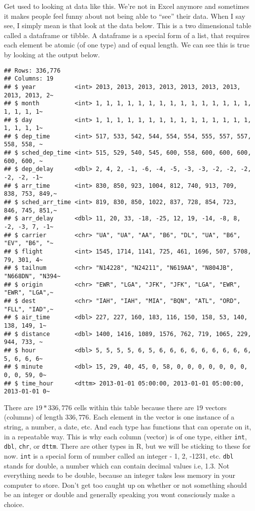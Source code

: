 \documentclass[
]{book}
\begin{document}
Get used to looking at data like this. We're not in Excel anymore and sometimes it makes people feel funny about not being able to ``see'' their data. When I say see, I simply mean is that look at the data below. This is a two dimensional table called a dataframe or tibble. A dataframe is a special form of a list, that requires each element be atomic (of one type) and of equal length. We can see this is true by looking at the output below.

\begin{verbatim}
## Rows: 336,776
## Columns: 19
## $ year           <int> 2013, 2013, 2013, 2013, 2013, 2013, 2013, 2013, 2013, 2~
## $ month          <int> 1, 1, 1, 1, 1, 1, 1, 1, 1, 1, 1, 1, 1, 1, 1, 1, 1, 1, 1~
## $ day            <int> 1, 1, 1, 1, 1, 1, 1, 1, 1, 1, 1, 1, 1, 1, 1, 1, 1, 1, 1~
## $ dep_time       <int> 517, 533, 542, 544, 554, 554, 555, 557, 557, 558, 558, ~
## $ sched_dep_time <int> 515, 529, 540, 545, 600, 558, 600, 600, 600, 600, 600, ~
## $ dep_delay      <dbl> 2, 4, 2, -1, -6, -4, -5, -3, -3, -2, -2, -2, -2, -2, -1~
## $ arr_time       <int> 830, 850, 923, 1004, 812, 740, 913, 709, 838, 753, 849,~
## $ sched_arr_time <int> 819, 830, 850, 1022, 837, 728, 854, 723, 846, 745, 851,~
## $ arr_delay      <dbl> 11, 20, 33, -18, -25, 12, 19, -14, -8, 8, -2, -3, 7, -1~
## $ carrier        <chr> "UA", "UA", "AA", "B6", "DL", "UA", "B6", "EV", "B6", "~
## $ flight         <int> 1545, 1714, 1141, 725, 461, 1696, 507, 5708, 79, 301, 4~
## $ tailnum        <chr> "N14228", "N24211", "N619AA", "N804JB", "N668DN", "N394~
## $ origin         <chr> "EWR", "LGA", "JFK", "JFK", "LGA", "EWR", "EWR", "LGA",~
## $ dest           <chr> "IAH", "IAH", "MIA", "BQN", "ATL", "ORD", "FLL", "IAD",~
## $ air_time       <dbl> 227, 227, 160, 183, 116, 150, 158, 53, 140, 138, 149, 1~
## $ distance       <dbl> 1400, 1416, 1089, 1576, 762, 719, 1065, 229, 944, 733, ~
## $ hour           <dbl> 5, 5, 5, 5, 6, 5, 6, 6, 6, 6, 6, 6, 6, 6, 6, 5, 6, 6, 6~
## $ minute         <dbl> 15, 29, 40, 45, 0, 58, 0, 0, 0, 0, 0, 0, 0, 0, 0, 59, 0~
## $ time_hour      <dttm> 2013-01-01 05:00:00, 2013-01-01 05:00:00, 2013-01-01 0~
\end{verbatim}

There are \(19*336,776\) cells within this table because there are \(19\) vectors (columns) of length \(336,776\). Each element in the vector is one instance of a string, a number, a date, etc. And each type has functions that can operate on it, in a repeatable way. This is why each column (vector) is of one type, either \texttt{int}, \texttt{dbl}, \texttt{chr}, or \texttt{dttm}. There are other types in R, but we will be sticking to these for now. \texttt{int} is a special form of number called an integer - 1, 2, -1231, etc. \texttt{dbl} stands for double, a number which can contain decimal values i.e, 1.3. Not everything needs to be double, because an integer takes less memory in your computer to store. Don't get too caught up on whether or not something should be an integer or double and generally speaking you wont consciously make a choice.
\end{document}
